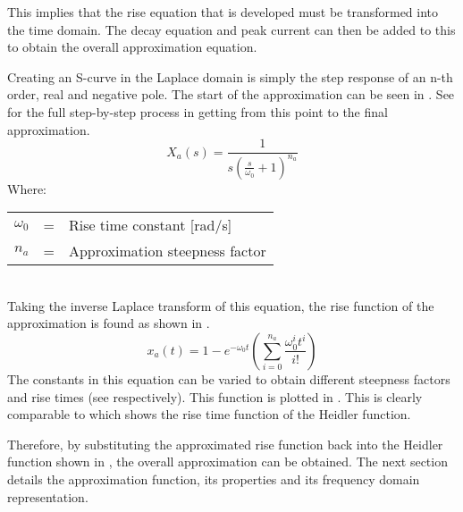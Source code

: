 This implies that the rise equation that is developed must be transformed into the time domain. The decay equation and peak current can then be added to this to obtain the overall approximation equation.

Creating an S-curve in the Laplace domain is simply the step response of an n-th order, real and negative pole. The start of the approximation can be seen in . See  for the full step-by-step process in getting from this point to the final approximation.
\begin{equation}
    X_a \left( s \right) = \frac{1}{s \left ( \frac{s}{\omega_0} +1 \right )^{n_a}}
    \label{eqn:approxRiseLaplace}
\end{equation}
Where: \\
\begin{tabular}{cll}
    $\omega_0$ & = & Rise time constant [rad/s] \\
    $n_a$ & = & Approximation steepness factor
\end{tabular}\\

Taking the inverse Laplace transform of this equation, the rise function of the approximation is found as shown in .
\begin{equation}
    x_a \left( t \right) = 1 - e^{-\omega_0 t} \left ( \sum\limits_{i=0}^{n_a} \frac{\omega_0^i t^i}{i!} \right )
    \label{eqn:approxRise}
\end{equation}
The constants in this equation can be varied to obtain different steepness factors and rise times (see  respectively). This function is plotted in . This is clearly comparable to  which shows the rise time function of the Heidler function.

Therefore, by substituting the approximated rise function back into the Heidler function shown in , the overall approximation can be obtained. The next section details the approximation function, its properties and its frequency domain representation.


